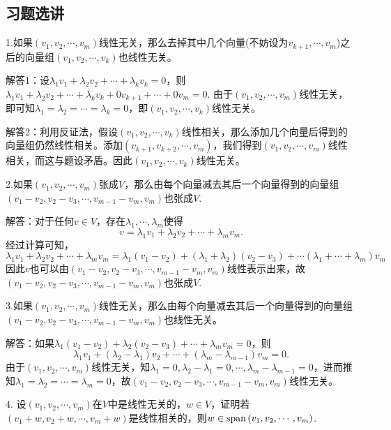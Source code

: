 \documentclass[hyperref,]{ctexart}
\begin{document}
\subsection{习题选讲}\label{ux4e60ux9898ux9009ux8bb2-1}

\noindent{}
1.如果\((v_1,v_2,\cdots,v_m)\)线性无关，那么去掉其中几个向量(不妨设为\(v_{k+1},\cdots,v_m\))之后的向量组\((v_1,v_2,\cdots,v_k)\)也线性无关。

\noindent{}
解答1：设\(\lambda_1 v_1+\lambda_2 v_2 +\cdots+\lambda_k v_k=0\)，则\(\lambda_1 v_1+\lambda_2 v_2 +\cdots+\lambda_k v_k + 0 v_{k+1}+\cdots+0v_m=0\).
由于\((v_1,v_2,\cdots,v_m)\)线性无关，即可知\(\lambda_1=\lambda_2=\cdots=\lambda_k=0\)，即\((v_1,v_2,\cdots,v_k)\)线性无关。

\noindent{}
解答2：利用反证法，假设\((v_1,v_2,\cdots,v_k)\)线性相关，那么添加几个向量后得到的向量组仍然线性相关。添加\((v_{k+1},v_{k+2},\cdots,v_m)\)，我们得到\((v_1,v_2,\cdots,v_m)\)线性相关，而这与题设矛盾。因此\((v_1,v_2,\cdots,v_k)\)线性无关。

\bigskip

\noindent{}
2.如果\((v_1,v_2,\cdots,v_m)\)张成\(V\)，那么由每个向量减去其后一个向量得到的向量组\((v_1-v_2,v_2-v_3,\cdots,v_{m-1}-v_m,v_m)\)也张成\(V\).

\noindent{}
解答：对于任何\(v\in V\)，存在\(\lambda_1,\cdots,\lambda_m\)使得
\[v = \lambda_1v_1+\lambda_2 v_2+\cdots+\lambda_mv_m.\] 经过计算可知，
\[\lambda_1v_1+\lambda_2 v_2+\cdots+\lambda_mv_m=\lambda_1(v_1-v_2)+(\lambda_1+\lambda_2)(v_2-v_3)+\cdots (\lambda_1+\cdots+\lambda_m)v_m\]
因此\(v\)也可以由\((v_1-v_2,v_2-v_3,\cdots,v_{m-1}-v_m,v_m)\)线性表示出来，故\((v_1-v_2,v_2-v_3,\cdots,v_{m-1}-v_m,v_m)\)也张成\(V\).

\bigskip

\noindent{}
3.如果\((v_1,v_2,\cdots,v_m)\)线性无关，那么由每个向量减去其后一个向量得到的向量组\((v_1-v_2,v_2-v_3,\cdots,v_{m-1}-v_m,v_m)\)也线性无关。

\noindent{}
解答：如果\(\lambda_1 (v_1-v_2)+\lambda_2 (v_2-v_3)+\cdots+\lambda_m v_m=0\)，则
\[\lambda_1 v_1+(\lambda_2-\lambda_1)v_2 +\cdots+(\lambda_m-\lambda_{m-1})v_m=0.\]
由于\((v_1,v_2,\cdots,v_m)\)线性无关，知\(\lambda_1=0,\lambda_2-\lambda_1=0,\cdots,\lambda_m-\lambda_{m-1}=0\)，进而推知\(\lambda_1=\lambda_2=\cdots=\lambda_m=0\)，故\((v_1-v_2,v_2-v_3,\cdots,v_{m-1}-v_m,v_m)\)线性无关。

\bigskip  

\noindent{} 4.
设\((v_1,v_2,\cdots,v_m)\)在\(V\)中是线性无关的，\(w\in V\)，证明若\((v_1+w,v_2+w,\cdots,v_m+w)\)是线性相关的，则\(w\in\mathrm{span}\,(v_1,v_2,\cdots,v_m)\).
\end{document}
